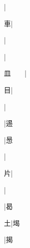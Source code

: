 \begin{multicols}{2}
{{\cjk{}{\cnsym{}　}{\cnsym{}　}{\cnsym{}　}}|{}\par
{\cjk{}{\cnsym{}　}{\cnsym{}　}車}|{}\par
{}|{}\par
{\cjk{}{\cnsym{}　}{\cnsym{}　}{\cnsym{}　}}|{}\par
{\cjk{}皿{\cnsym{}　}{\cnsym{}　}}|{}\par
{目}|{}\par
{\cjk{}{\cnsym{}　}{\cnsym{}　}{\cnsym{}　}}|{}\par
{\cjk{}{\cnsym{}　}{\cnsym{}　}{\cnsym{}　}}|{\cjk{}逷}\par
{\cjk{}{\cnsym{}　}{\cnsym{}　}{\cnsym{}　}}|{\cjk{}惖}\par
{\cjk{}{\cnsym{}　}{\cnsym{}　}{\cnsym{}　}}|{}\par
{\cjk{}{\cnsym{}　}{\cnsym{}　}片}|{}\par
{}|{}\par
{\cjk{}{\cnsym{}　}{\cnsym{}　}{\cnsym{}　}}|{\cjk{}曷}\par
{\cjk{}{\cnsym{}　}{\cnsym{}　}土}|{\cjk{}堨}\par
{}|{\cjk{}揭}\par
}
\end{multicols}
